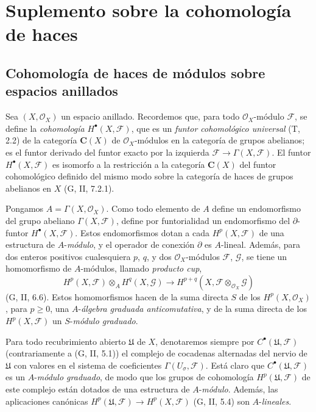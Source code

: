\section{Suplemento sobre la cohomología de haces}
\label{section:0.12}
\label{section:0.12-fr}

\subsection{Cohomología de haces de módulos sobre espacios anillados}
\label{subsection:0.12.1}
\label{subsection:0.12.1-fr}

\begin{env}[12.1.1]
\label{0.12.1.1}
\label{0.12.1.1-fr}

Sea $(X,\mathcal O_X)$ un espacio anillado.
Recordemos que, para todo $\mathcal O_X$-módulo $\mathcal F$, se define la
\emph{cohomología} $H^\bullet(X,\mathcal F)$, que es un \emph{funtor cohomológico universal}
(T, 2.2) de la categoría $\boldsymbol{C}(X)$ de
$\mathcal O_X$-módulos en la categoría de grupos abelianos; es el funtor derivado
del funtor exacto por la izquierda
$\mathcal F\to\Gamma(X,\mathcal F)$.
El funtor $H^\bullet(X,\mathcal F)$ es isomorfo
a la restricción a la categoría $\boldsymbol{C}(X)$ del funtor cohomológico
definido del mismo modo sobre la categoría de haces de grupos abelianos
en $X$ (G, II, 7.2.1).
\end{env}

\begin{env}[12.1.2]
\label{0.12.1.2}
\label{0.12.1.2-fr}
Pongamos $A=\Gamma(X,\mathcal O_X)$.
Como todo elemento de $A$ define un endomorfismo del grupo abeliano
$\Gamma(X,\mathcal F)$, define por funtorialidad un endomorfismo del
$\partial$-funtor $H^\bullet(X,\mathcal F)$.
Estos endomorfismos dotan a cada $H^p(X,\mathcal F)$ de una
estructura de $A$-\emph{módulo}, y el operador de conexión $\partial$ es
$A$-lineal. Además, para dos enteros positivos cualesquiera $p$, $q$, y dos $\mathcal O_X$-módulos $\mathcal F$, $\mathcal G$, se tiene un homomorfismo de $A$-módulos, llamado \emph{producto cup},
\[
\label{0.12.1.2.1-fr}
\tag{12.1.2.1}
H^p(X,\mathcal F)\otimes_A H^q(X,\mathcal G)
\longrightarrow H^{p+q}(X,\mathcal F\otimes_{\mathcal O_X}\mathcal G)
\]
(G, II, 6.6).
Estos homomorfismos hacen de la suma directa $S$ de los
$H^p(X,\mathcal O_X)$, para $p\geq0$, una $A$-\emph{álgebra graduada
anticomutativa}, y de la suma directa de los $H^p(X,\mathcal F)$ un
$S$-\emph{módulo graduado}.

Para todo recubrimiento abierto $\mathfrak U$ de $X$, denotaremos siempre
por $C^\bullet(\mathfrak U,\mathcal F)$ (contrariamente a
(G, II, 5.1)) el complejo de cocadenas alternadas del nervio de
$\mathfrak U$ con valores en el sistema de coeficientes
$\Gamma(U_\sigma,\mathcal F)$.
Está claro que
$C^\bullet(\mathfrak U,\mathcal F)$ es un
$A$-\emph{módulo graduado}, de modo que los grupos de cohomología
$H^p(\mathfrak U,\mathcal F)$ de este complejo están dotados de
una estructura de $A$-\emph{módulo}.
Además, las aplicaciones canónicas
$H^p(\mathfrak U,\mathcal F)\to H^p(X,\mathcal F)$
(G, II, 5.4) son $A$-\emph{lineales}.
\end{env}


